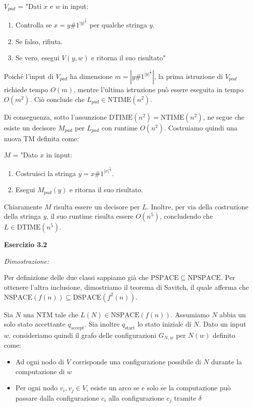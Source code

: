 \documentclass[12pt,a4paper]{report}
\theoremstyle{definition}
\newcommand{\abs}[1]{\left|#1\right|}
\begin{document}
        $V_{pad}$ = "Dati $x$ e $w$ in input:
        \begin{enumerate}
            \item Controlla se $x = y\#1^{{\abs{y}}^{\frac{5}{2}}}$ per qualche stringa $y$.
            \item Se falso, rifiuta.
            \item Se vero, esegui $V(y,w)$ e ritorna il suo risultato"
        \end{enumerate}

        Poiché l'input di $V_{pad}$ ha dimensione $m = \abs{y\#1^{{\abs{y}}^{\frac{5}{2}}}}$, la prima istruzione di $V_{pad}$ richiede tempo $O(m)$, mentre l'ultima istruzione può essere eseguita in tempo $O(m^2)$. Ciò conclude che $L_{pad} \in \mathrm{NTIME}(n^2)$.
        
        Di conseguenza, sotto l'assunzione $\mathrm{DTIME}(n^2) = \mathrm{NTIME}(n^2)$, ne segue che esiste un decisore $M_{pad}$ per $L_{pad}$ con runtime $O(n^2)$. Costruiamo quindi una nuova TM definita come:

        $M$ = "Dato $x$ in input:
        \begin{enumerate}
            \item Costruisci la stringa $y = x\#1^{{\abs{x}}^{\frac{5}{2}}}$.
            \item Esegui $M_{pad}(y)$ e ritorna il suo risultato.
        \end{enumerate}

        Chiaramente $M$ risulta essere un decisore per $L$. Inoltre, per via della costruzione della stringa $y$, il suo runtime risulta essere $O(n^5)$, concludendo che $L \in \mathrm{DTIME}(n^5)$.


        \newpage

        \textbf{Esercizio 3.2}

        \textit{Dimostrazione:}

        Per definizione delle due classi sappiamo già che $\mathrm{PSPACE} \subseteq \mathrm{NPSPACE}$. Per ottenere l'altra inclusione, dimostriamo il teorema di Savitch, il quale afferma che $\mathrm{NSPACE}(f(n)) \subseteq \mathrm{DSPACE}(f^2(n))$.

        Sia $N$ una \textsf{NTM} tale che $L(N) \in \mathrm{NSPACE}(f(n))$. Assumiamo $N$ abbia un solo stato accettante $q_\mathrm{accept}$. Sia inoltre $q_\mathrm{start}$ lo stato iniziale di $N$. Dato un input $w$, consideriamo quindi il grafo delle configurazioni $G_{N,w}$ per $N(w)$ definito come:
        \begin{itemize}
            \item Ad ogni nodo di $V$ corrisponde una configurazione possibile di $N$ durante la computazione di $w$
            \item Per ogni nodo $v_i, v_j \in V$, esiste un arco se e solo se la computazione può passare dalla configurazione $c_i$ alla configurazione $c_j$ tramite $\delta$
        \end{itemize}
        
\end{document}
